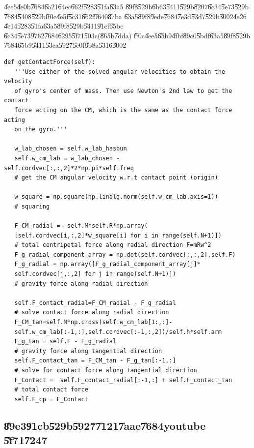 \bigskip

\U{4ee5}\U{4e0b}\U{7684}\U{6a21}\U{64ec}\U{662f}\U{5283}\U{51fa}\U{63a5}%
\U{89f8}\U{529b}\U{6b63}\U{5411}\U{529b}\U{8207}\U{6c34}\U{5e73}\U{529b}%
\U{7684}\U{5408}\U{529b}\U{ff0c}\U{4e5f}\U{5c31}\U{662f}\U{9640}\U{87ba}%
\U{63a5}\U{89f8}\U{9ede}\U{7684}\U{7e3d}\U{53d7}\U{529b}\U{3002}\U{4e26}%
\U{4e14}\U{5283}\U{51fa}\U{63a5}\U{89f8}\U{529b}\U{5411}\U{91cf}\U{65bc}%
\U{6c34}\U{5e73}\U{9762}\U{7684}\U{6295}\U{5f71}\U{503c}(\U{865b}\U{7dda})%
\U{ff0c}\U{4ee5}\U{65b9}\U{4fbf}\U{89c0}\U{5bdf}\U{63a5}\U{89f8}\U{529b}%
\U{7684}\U{65b9}\U{5411}\U{53ca}\U{5927}\U{5c0f}\U{8b8a}\U{5316}\U{3002}

\bigskip

\begin{verbatim} 
def getContactForce(self):
   '''Use either of the solved angular velocities to obtain the velocity 
   of gyro's center of mass. Then use Newton's 2nd law to get the contact 
   force acting on the CM, which is the same as the contact force acting 
   on the gyro.'''

   w_lab_chosen = self.w_lab_hasbun
   self.w_cm_lab = w_lab_chosen - self.cordvec[:,:,2]*2*np.pi*self.freq
   # get the CM angular velocity w.r.t contact point (origin)
   
   w_square = np.square(np.linalg.norm(self.w_cm_lab,axis=1))
   # squaring
   
   F_CM_radial = -self.M*self.R*np.array(
   [self.cordvec[i,:,2]*w_square[i] for i in range(self.N+1)])
   # total centripetal force along radial direction F=mRw^2
   F_g_radial_component_array = np.dot(self.cordvec[:,:,2],self.F)
   F_g_radial = np.array([F_g_radial_component_array[j]*
   self.cordvec[j,:,2] for j in range(self.N+1)])
   # gravity force along radial direction 

   self.F_contact_radial=F_CM_radial - F_g_radial 
   # solve contact force along radial direction
   F_CM_tan=self.M*np.cross(self.w_cm_lab[1:,:]-
   self.w_cm_lab[:-1,:],self.cordvec[:-1,:,2])/self.h*self.arm
   F_g_tan = self.F - F_g_radial
   # gravity force along tangential direction
   self.F_contact_tan = F_CM_tan - F_g_tan[:-1,:]
   # solve for contact force along tangential direction
   F_Contact =  self.F_contact_radial[:-1,:] + self.F_contact_tan
   # total contact force
   self.F_cp = F_Contact
\end{verbatim}

\subsection{\U{89e3}\U{91cb}\U{529b}\U{5927}\U{7121}\U{7aae}\U{7684}youtube%
\U{5f71}\U{7247}}

